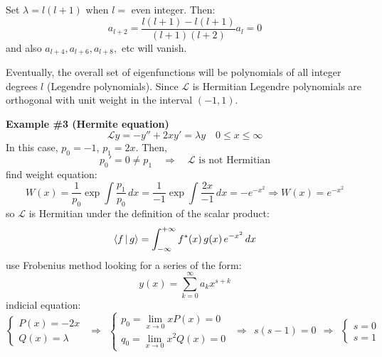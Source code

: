 \documentclass{article}
\begin{document}
\noindent
Set $\lambda = l(l+1)$ when $l =$ even integer. Then:
\begin{equation}
    a_{l+2} = \frac{l(l+1) - l(l+1)}{(l+1)(l+2)} a_l = 0
\end{equation}
and also $a_{l+4}, a_{l+6}, a_{l+8},$ etc will vanish.

\noindent
Eventually, the overall set of eigenfunctions will be polynomials of all integer degrees $l$ (Legendre polynomials). Since $\mathcal{L}$ is Hermitian Legendre polynomials are orthogonal with unit weight in the interval $(-1,1)$.

\noindent
\textbf{Example \#3 (Hermite equation)}
\begin{equation}
    \mathcal{L} y = -y'' +2xy' =\lambda y \quad 0 \leq x \leq \infty
\end{equation}
In this case, $p_0 = -1$, $p_1 = 2x $. Then,
\begin{equation}
    p_0 ' = 0 \neq p_1 \quad \Rightarrow \quad \mathcal{L}\text{ is not Hermitian}
\end{equation}
find weight equation:
\begin{equation}
    W(x) = \frac{1}{p_0} \exp{\int \frac{p_1}{p_0} \, dx}
= \frac{1}{-1} \exp{\int \frac{2x}{-1} \, dx} = - e^{-x^2} \Rightarrow W(x) = e^{-x^2}
\end{equation}
so $\mathcal{L}$ is Hermitian under the definition of the scalar product:
\begin{equation}
    \Braket{f | g} = \int_{-\infty}^{+\infty} f^*(x)\, g(x)\, e^{-x^2} \, dx
\end{equation}
use Frobenius method looking for a series of the form:
\begin{equation}
    y(x) = \sum_{k=0}^{\infty} a_k x^{s + k}
\end{equation}
indicial equation:
\begin{equation}
    \begin{cases}
        P(x) = -2x \\ Q(x) = \lambda
    \end{cases} \ \  \Rightarrow \ \ \begin{cases}
        p_0 = \lim_{x \rightarrow 0} xP(x) = 0 \\
        q_0 = \lim_{x \rightarrow 0} x^2 Q(x) = 0
    \end{cases} \ \ \Rightarrow \ \ s(s-1) = 0 \ \ \Rightarrow \ \ \begin{cases}
        s=0 \\ s=1
    \end{cases}
\end{equation}
\end{document}
